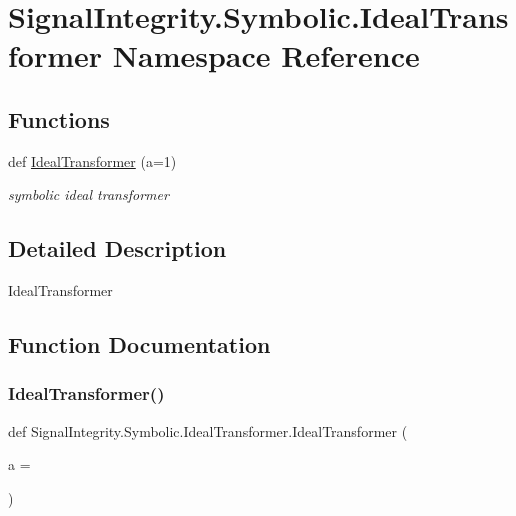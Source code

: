 \hypertarget{namespaceSignalIntegrity_1_1Symbolic_1_1IdealTransformer}{}\section{Signal\+Integrity.\+Symbolic.\+Ideal\+Transformer Namespace Reference}
\label{namespaceSignalIntegrity_1_1Symbolic_1_1IdealTransformer}
\subsection*{Functions}
\begin{DoxyCompactItemize}
\item 
def \hyperlink{namespaceSignalIntegrity_1_1Symbolic_1_1IdealTransformer_a84f38b646d04c5c749192df4e02ccf46}{Ideal\+Transformer} (a=1)
\begin{DoxyCompactList}\small\item\em symbolic ideal transformer \end{DoxyCompactList}\end{DoxyCompactItemize}


\subsection{Detailed Description}
\begin{DoxyVerb}IdealTransformer\end{DoxyVerb}
 

\subsection{Function Documentation}
\mbox{\label{namespaceSignalIntegrity_1_1Symbolic_1_1IdealTransformer_a84f38b646d04c5c749192df4e02ccf46}} 
\subsubsection{\texorpdfstring{Ideal\+Transformer()}{IdealTransformer()}}
{\footnotesize\ttfamily def Signal\+Integrity.\+Symbolic.\+Ideal\+Transformer.\+Ideal\+Transformer (\begin{DoxyParamCaption}\item[{}]{a = {} }\end{DoxyParamCaption})}



